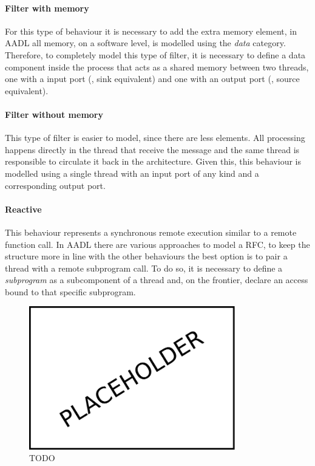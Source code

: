 \paragraph{Filter with memory} For this type of behaviour it is necessary to add the extra memory element, in AADL all memory, on a software level, is modelled using the \textit{data} category. Therefore, to completely model this type of filter, it is necessary to define a data component inside the process that acts as a shared memory between two threads, one with a input port (\ie, sink equivalent) and one with an output port (\ie, source equivalent).
\paragraph{Filter without memory} This type of filter is easier to model, since there are less elements. All processing happens directly in the thread that receive the message and the same thread is responsible to circulate it back in the architecture. Given this, this behaviour is modelled using a single thread with an input port of any kind and a corresponding output port.
\paragraph{Reactive} This behaviour represents a synchronous remote execution similar to a remote function call. In AADL there are various approaches to model a RFC, to keep the structure more in line with the other behaviours the best option is to pair a thread with a remote subprogram call. To do so, it is necessary to define a \textit{subprogram} as a subcomponent of a thread and, on the frontier, declare an access bound to that specific subprogram.

\begin{figure}[t]
    \centering
    \includegraphics[width=0.8\textwidth]{gfx/placeholder}
    \caption{TODO}\label{fig:cnc-arch}
\end{figure}

